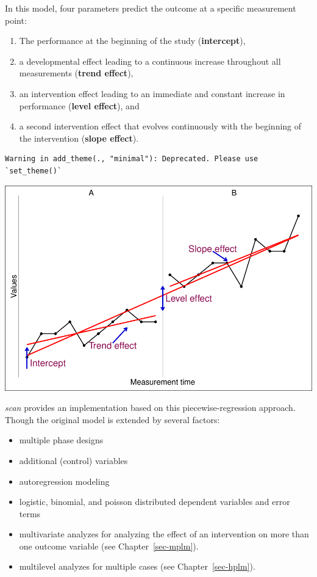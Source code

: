 \documentclass[
  letterpaper,
  DIV=11,
  numbers=noendperiod]{scrreprt}
\providecommand{\tightlist}{%
  \setlength{\itemsep}{0pt}\setlength{\parskip}{0pt}}\usepackage{longtable,booktabs,array}
\begin{document}
In this model, four parameters predict the outcome at a specific
measurement point:

\begin{enumerate}
\def\labelenumi{\arabic{enumi}.}
\item
  The performance at the beginning of the study (\textbf{intercept}),
\item
  a developmental effect leading to a continuous increase throughout all
  measurements (\textbf{trend effect}),
\item
  an intervention effect leading to an immediate and constant increase
  in performance (\textbf{level effect}), and
\item
  a second intervention effect that evolves continuously with the
  beginning of the intervention (\textbf{slope effect}).
\end{enumerate}

\begin{verbatim}
Warning in add_theme(., "minimal"): Deprecated. Please use `set_theme()`
\end{verbatim}

\includegraphics{./ch_piecewise_regression_files/figure-pdf/figure-plm-1.pdf}

\emph{scan} provides an implementation based on this
piecewise-regression approach. Though the original model is extended by
several factors:

\begin{itemize}
\tightlist
\item
  multiple phase designs
\item
  additional (control) variables
\item
  autoregression modeling
\item
  logistic, binomial, and poisson distributed dependent variables and
  error terms
\item
  multivariate analyzes for analyzing the effect of an intervention on
  more than one outcome variable (see Chapter~\ref{sec-mplm}).
\item
  multilevel analyzes for multiple cases (see Chapter~\ref{sec-hplm}).
\end{itemize}
\end{document}
